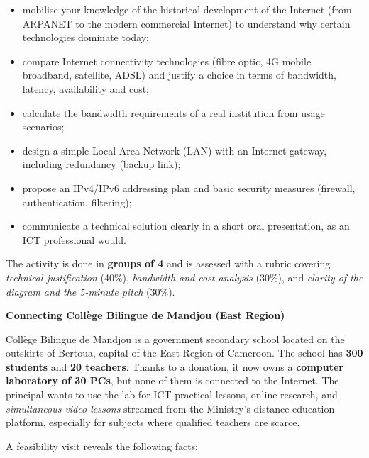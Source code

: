 \documentclass[11pt]{article}
\newcommand{\cle}[1]{{\popxbold\color{popdark}#1}}
\newcounter{popsec}
\newcounter{popsub}
\newcommand{\courssub}[1]{%
  \stepcounter{popsub}%
  \par\vspace{9pt}\noindent{\popxbold\fontsize{11.5}{13}\selectfont\color{popink}{\color{poporange}\thepopsec.\thepopsub}\hspace{6pt}#1}\par\nopagebreak\vspace{4pt}
}
\begin{document}
\begin{itemize}
\item mobilise your knowledge of the \cle{historical development} of the Internet (from ARPANET to the modern commercial Internet) to understand why certain technologies dominate today;
\item compare \cle{Internet connectivity technologies} (fibre optic, 4G mobile broadband, satellite, ADSL) and justify a choice in terms of bandwidth, latency, availability and cost;
\item calculate the \cle{bandwidth requirements} of a real institution from usage scenarios;
\item design a simple \cle{Local Area Network} (LAN) with an Internet gateway, including redundancy (backup link);
\item propose an \cle{IPv4/IPv6 addressing plan} and \cle{basic security measures} (firewall, authentication, filtering);
\item communicate a technical solution clearly in a short oral presentation, as an ICT professional would.
\end{itemize}

The activity is done in \textbf{groups of 4} and is assessed with a rubric covering \emph{technical justification} (40\%), \emph{bandwidth and cost analysis} (30\%), and \emph{clarity of the diagram and the 5-minute pitch} (30\%).

\courssub{Situation}

\textbf{Connecting Collège Bilingue de Mandjou (East Region)}\par

Collège Bilingue de Mandjou is a government secondary school located on the outskirts of Bertoua, capital of the East Region of Cameroon. The school has \textbf{300 students} and \textbf{20 teachers}. Thanks to a donation, it now owns a \textbf{computer laboratory of 30 PCs}, but none of them is connected to the Internet. The principal wants to use the lab for ICT practical lessons, online research, and \emph{simultaneous video lessons} streamed from the Ministry's distance-education platform, especially for subjects where qualified teachers are scarce.

A feasibility visit reveals the following facts:
\end{document}
